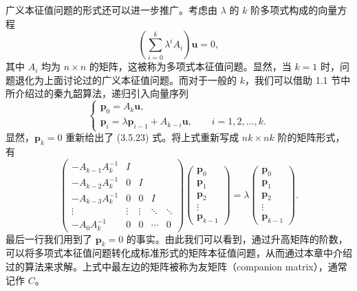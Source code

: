 广义本征值问题的形式还可以进一步推广。考虑由 $\lambda$ 的 $k$ 阶多项式构成的向量方程
\begin{equation}
\left(\sum_{i=0}^{k}\lambda^iA_i\right)\bm u=0,
\tag{3.5.23}
\end{equation}
其中 $A_i$ 均为 $n\times n$ 的矩阵，这被称为多项式本征值问题。显然，当 $k=1$ 时，问题退化为上面讨论过的广义本征值问题。而对于一般的 $k$，我们可以借助 1.1 节中所介绍过的秦九韶算法，递归引入向量序列
\begin{equation}
\begin{cases}
\bm p_0=A_k\bm u,\\
\bm p_i=\lambda\bm p_{i-1}+A_{k-i}\bm u,\qquad i=1,2,\ldots,k.
\end{cases}
\tag{3.5.24}
\end{equation}
显然，$\bm p_k=0$ 重新给出了 (3.5.23) 式。将上式重新写成 $nk\times nk$ 阶的矩阵形式，有
\begin{equation}
\begin{pmatrix}
-A_{k-1}A_k^{-1}&I&&&\\
-A_{k-2}A_k^{-1}&0&I&&\\
-A_{k-3}A_k^{-1}&0&0&I&\\
\vdots&\vdots&\vdots&\ddots&\ddots\\
-A_0A_k^{-1}&0&0&\cdots&0
\end{pmatrix}
\begin{pmatrix}\bm p_0\\\bm p_1\\\bm p_2\\\vdots\\\bm p_{k-1}\end{pmatrix}
=\lambda
\begin{pmatrix}\bm p_0\\\bm p_1\\\bm p_2\\\vdots\\\bm p_{k-1}\end{pmatrix}.
\tag{3.5.25}
\end{equation}
最后一行我们用到了 $\bm p_k=0$ 的事实。由此我们可以看到，通过升高矩阵的阶数，可以将多项式本征值问题转化成标准形式的矩阵本征值问题，从而通过本章中介绍过的算法来求解。上式中最左边的矩阵被称为友矩阵（companion matrix），通常记作 $C$。

